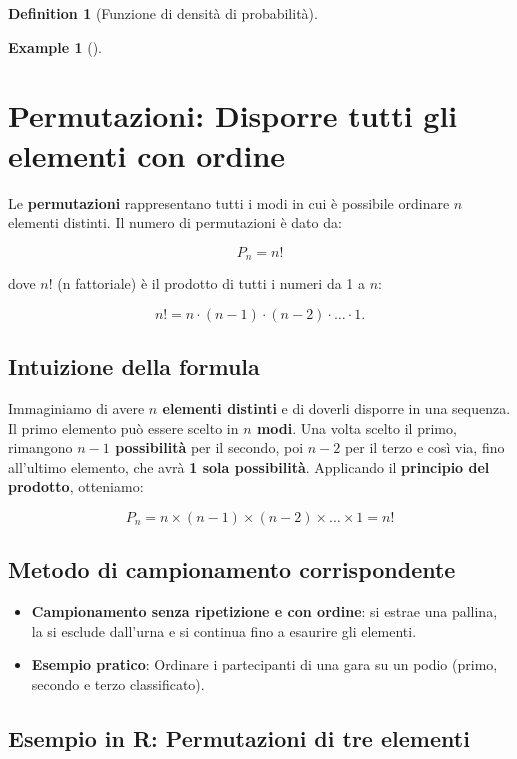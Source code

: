 \documentclass[
  letterpaper,
  DIV=11,
  numbers=noendperiod,
  oneside]{scrreprt}
\providecommand{\tightlist}{%
  \setlength{\itemsep}{0pt}\setlength{\parskip}{0pt}}
\theoremstyle{definition}
\newtheorem{example}{Example}[chapter]
\theoremstyle{plain}
\theoremstyle{definition}
\newtheorem{definition}{Definition}[chapter]
\theoremstyle{remark}
\begin{document}
\begin{definition}[Funzione di densità di
probabilità]
\begin{example}[]
\end{example}

\section{Permutazioni: Disporre tutti gli elementi con
ordine}\label{permutazioni-disporre-tutti-gli-elementi-con-ordine}

Le \textbf{permutazioni} rappresentano tutti i modi in cui è possibile
ordinare \(n\) elementi distinti. Il numero di permutazioni è dato da:

\[
P_n = n!
\]

dove \(n!\) (n fattoriale) è il prodotto di tutti i numeri da 1 a \(n\):

\[
n! = n \cdot (n-1) \cdot (n-2) \cdot \dots \cdot 1.
\]

\subsection{Intuizione della formula}\label{intuizione-della-formula}

Immaginiamo di avere \textbf{\(n\) elementi distinti} e di doverli
disporre in una sequenza. Il primo elemento può essere scelto in
\textbf{\(n\) modi}. Una volta scelto il primo, rimangono
\textbf{\(n-1\) possibilità} per il secondo, poi \textbf{\(n-2\)} per il
terzo e così via, fino all'ultimo elemento, che avrà \textbf{1 sola
possibilità}. Applicando il \textbf{principio del prodotto}, otteniamo:

\[
P_n = n \times (n-1) \times (n-2) \times \dots \times 1 = n!
\]

\subsection{Metodo di campionamento
corrispondente}\label{metodo-di-campionamento-corrispondente}

\begin{itemize}
\tightlist
\item
  \textbf{Campionamento senza ripetizione e con ordine}: si estrae una
  pallina, la si esclude dall'urna e si continua fino a esaurire gli
  elementi.\\
\item
  \textbf{Esempio pratico}: Ordinare i partecipanti di una gara su un
  podio (primo, secondo e terzo classificato).
\end{itemize}

\subsection{Esempio in R: Permutazioni di tre
elementi}\label{esempio-in-r-permutazioni-di-tre-elementi}


\end{definition}
\end{document}
